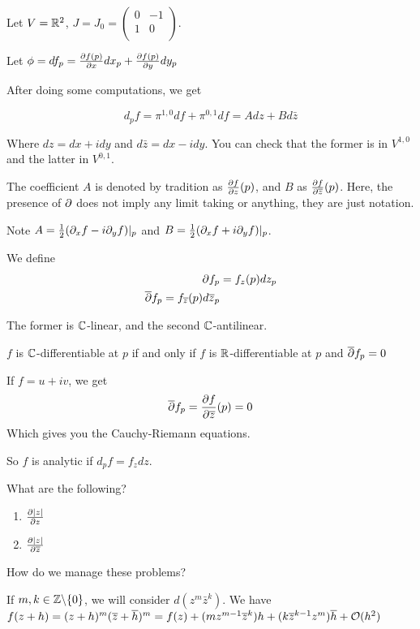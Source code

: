 \documentclass[x11names,reqno,14pt]{extarticle}
\begin{document}
Let $V = \mathbb{R}^2$, $J = J_0 = \begin{pmatrix} 0 & -1 \\ 1 & 0 \\ \end{pmatrix}$. 

Let $\phi = df_p = \frac{\partial f(p)}{\partial x}dx_p + \frac{\partial f(p)}{\partial y}dy_p$

After doing some computations, we get

\[
d_pf = \pi^{1, 0}df + \pi^{0, 1}df = Adz + Bd\bar{z}
\]

Where $dz = dx + idy$ and $d\bar{z} = dx - idy$. You can check that the former is in $V^{1, 0}$ and the latter in $V^{0, 1}$. 

The coefficient $A$ is denoted by tradition as $\frac{\partial f}{\partial z}(p)$, and $B$ as $\frac{\partial f}{\partial \overline{z}}(p)$. Here, the presence of $\partial$ does not imply any limit taking or anything, they are just notation. 

Note $A = \frac{1}{2}(\partial_xf - i\partial_yf)|_p$ and $B = \frac{1}{2}(\partial_xf + i\partial_yf)|_p$.


We define 
\begin{align*}
\partial f_p & = f_z(p)dz_p \\
\overline{\partial}f_p = f_{\overline{z}}(p)d\overline{z}_p \\
\end{align*}

The former is $\mathbb{C}$-linear, and the second $\mathbb{C}$-antilinear. 

\claim

$f$ is $\mathbb{C}$-differentiable at $p$ if and only if $f$ is $\mathbb{R}$-differentiable at $p$ and $\overline{\partial}f_p = 0$

\proof

If $f = u + iv$, we get
\[
\overline{\partial}f_p = \frac{\partial f}{\partial\overline{z}}(p) =0
\]
Which gives you the Cauchy-Riemann equations. 

So $f$ is analytic if $d_pf = f_zdz$. 

\exm

What are the following? 
\begin{enumerate}
\item $\frac{\partial|z|}{\partial z}$
\item $\frac{\partial|z|}{\partial\overline{z}}$
\end{enumerate}

How do we manage these problems?

\claim If $m, k \in \mathbb{Z}\backslash\{0\}$, we will consider $d(z^m\bar{z}^k)$. We have $f(z + h) = (z + h)^m(\overline{z} + \overline{h})^m = f(z) + (mz^{m-1}\overline{z}^k)h + (k\overline{z}^{k - 1}z^m)\overline{h} + \mathcal{O}(h^2)$
\end{document}
